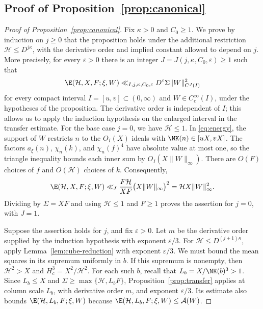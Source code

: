 \subsection{Proof of Proposition~\ref{prop:canonical}}
\label{sec:canonical-proof}
\begin{proof}[Proof of Proposition~\ref{prop:canonical}]
Fix $\kappa>0$ and $C_0\ge1$. We prove by induction on $j\ge0$
that the proposition holds under the additional restriction
$\mathcal H\le D^{j\kappa}$, with the derivative order and implied
constant allowed to depend on $j$. More precisely, for every
$\varepsilon>0$ there is an integer $J=J(j,\kappa,C_0,\varepsilon)\ge1$
such that
\[
 \E(\mathcal H,X,F;\xi,W)
 \ll_{I,j,\kappa,C_0,\varepsilon}
 D^\varepsilon\Sigma\|W\|_{C^J(I)}^2
\]
for every compact interval $I=[u,v]\subset(0,\infty)$ and
$W\in C_c^\infty(I)$, under the hypotheses of the proposition.
The derivative order is independent of $I$; this allows us to apply
the induction hypothesis on the enlarged interval in the transfer estimate.
For the base case $j=0$, we have $\mathcal H\le1$.
In \eqref{eq:energy}, the support of $W$ restricts $n$ to the
$O_I(X)$ ideals with $\NK(n)\in[uX,vX]$.
The factors $a_\xi(n)$, $\chi_n(k)$, and $\chi_n(f)^4$ have absolute
value at most one, so the triangle inequality bounds each inner sum
by $O_I(X\|W\|_\infty)$.
There are $O(F)$ choices of $f$ and $O(\mathcal H)$ choices of $k$.
Consequently,
\[
 \E(\mathcal H,X,F;\xi,W)
 \ll_I\frac{F\mathcal H}{XF}
       \bigl(X\|W\|_\infty\bigr)^2
 =\mathcal H X\|W\|_\infty^2.
\]
Dividing by $\Sigma=XF$ and using $\mathcal H\le1$ and $F\ge1$
proves the assertion for $j=0$, with $J=1$.

Suppose the assertion holds for $j$, and fix $\varepsilon>0$.
Let $m$ be the derivative order supplied by the induction hypothesis
with exponent $\varepsilon/3$. For $\mathcal H\le D^{(j+1)\kappa}$,
apply Lemma~\ref{lem:cube-reduction} with exponent $\varepsilon/3$.
We must bound the mean squares in its supremum uniformly in $b$.
If this supremum is nonempty, then $\mathcal H^2>X$ and
$H_c^3=X^2/\mathcal H^2$.
For each such $b$, recall that $L_b=X/\NK(b)^3>1$.
Since $L_b\le X$ and $\Sigma\ge\max\{\mathcal H,L_bF\}$,
Proposition~\ref{prop:transfer} applies at column scale $L_b$, with derivative
order $m$, and exponent $\varepsilon/3$.
Its estimate also bounds $\E(\mathcal H,L_b,F;\xi,W)$ because
$\E(\mathcal H,L_b,F;\xi,W)\le\mathcal A(W)$.


\end{proof}
